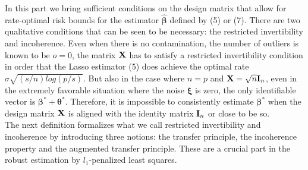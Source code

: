 \documentclass[a4paper,10pt]{article}
\theoremstyle{definition}
\begin{document}
In this part we bring sufficient conditions on the design matrix that allow for rate-optimal risk bounds for the estimator $\boldsymbol{\hat{\beta}}$ defined by (5) or (7). There are two qualitative conditions that can be seen to be necessary: the restricted invertibility and incoherence. Even when there is no contamination, the number of outliers is known to be $o=0$, the matrix $\bold{X}$ has to satisfy a restricted invertibility condition in order that the Lasso estimator (5) does achieve the optimal rate $\sigma\sqrt{(s/n)log(p/s)}$. But also in the case where $n=p$ and $\bold{X} = \sqrt{n}\bold{I}_n$, even in the extremely favorable situation where the noise $\boldsymbol{\xi}$ is zero, the only identifiable vector is $\boldsymbol{\beta}^* + \boldsymbol{\theta}^*$. Therefore, it is impossible to consistently estimate $\boldsymbol{\beta}^*$ when the design matrix $\bold{X}$ is aligned with the identity matrix $\bold{I}_n$ or close to be so.\\

The next definition formalizes what we call restricted invertibility and incoherence by introducing three notions: the transfer principle, the incoherence property and the augmented transfer principle. These are a crucial part in the robust estimation by $l_1$-penalized least squares.
\end{document}
